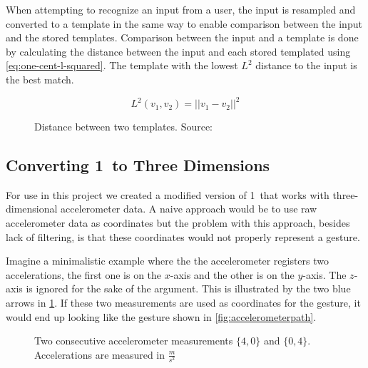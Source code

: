 When attempting to recognize an input from a user, the input is resampled and converted to a template in the same way to enable comparison between the input and the stored templates.
Comparison between the input and a template is done by calculating the distance between the input and each stored templated using \cref{eq:one-cent-l-squared}.
The template with the lowest $L^2$ distance to the input is the best match.

\begin{figure}[h]
\begin{equation}
L^{2}(v_1, v_2) = \lvert\lvert v_1 - v_2 \rvert\rvert^2
\label{eq:one-cent-l-squared}
\end{equation}
\caption{Distance between two templates. Source: \cite{herold20121}}
\end{figure}

\subsection{Converting 1\textcent~to Three Dimensions}
For use in this project we created a modified version of 1\textcent~that works with three-dimensional accelerometer data.
A naive approach would be to use raw accelerometer data as coordinates but the problem with this approach, besides lack of filtering, is that these coordinates would not properly represent a gesture.

Imagine a minimalistic example where the the accelerometer registers two accelerations, the first one is on the $x$-axis and the other is on the $y$-axis.
The $z$-axis is ignored for the sake of the argument.
This is illustrated by the two blue arrows in \cref{fig:accelerometerpoints}.
If these two measurements are used as coordinates for the gesture, it would end up looking like the gesture shown in \cref{fig:accelerometerpath}.

\begin{figure}[h]
\centering
\caption{Two consecutive accelerometer measurements $\{4,0\}$ and $\{0,4\}$. Accelerations are measured in $\frac{m}{s^2}$}
\label{fig:accelerometerpoints}
\end{figure}

